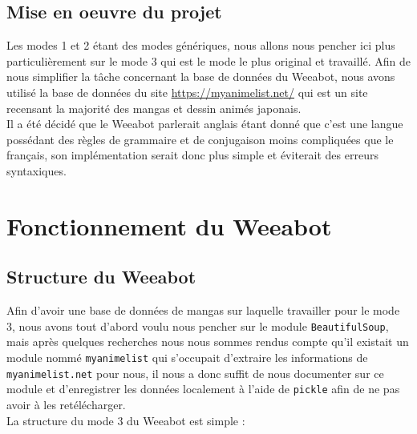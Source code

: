 \documentclass[paper=a4, fontsize=11pt]{article}
\begin{document}
\subsection{Mise en oeuvre du projet}
Les modes 1 et 2 étant des modes génériques, nous allons nous pencher ici plus particulièrement sur le mode 3 qui est le mode le plus original et travaillé. Afin de nous simplifier la tâche concernant la base de données du Weeabot, nous avons utilisé la base de données du site \url{https://myanimelist.net/} qui est un site recensant la majorité des mangas et dessin animés japonais.\\
Il a été décidé que le Weeabot parlerait anglais étant donné que c'est une langue possédant des règles de grammaire et de conjugaison moins compliquées que le français, son implémentation serait donc plus simple et éviterait des erreurs syntaxiques.\\


\section{Fonctionnement du Weeabot}

\subsection{Structure du Weeabot}

Afin d'avoir une base de données de mangas sur laquelle travailler pour le mode 3, nous avons tout d'abord voulu nous pencher sur le module \texttt{BeautifulSoup}, mais après quelques recherches nous nous sommes rendus compte qu'il existait un module nommé \texttt{myanimelist} qui s'occupait d'extraire les informations de \texttt{myanimelist.net} pour nous, il nous a donc suffit de nous documenter sur ce module et d'enregistrer les données localement à l'aide de \texttt{pickle} afin de ne pas avoir à les retélécharger. \\

La structure du mode 3 du Weeabot est simple :\\
\end{document}
